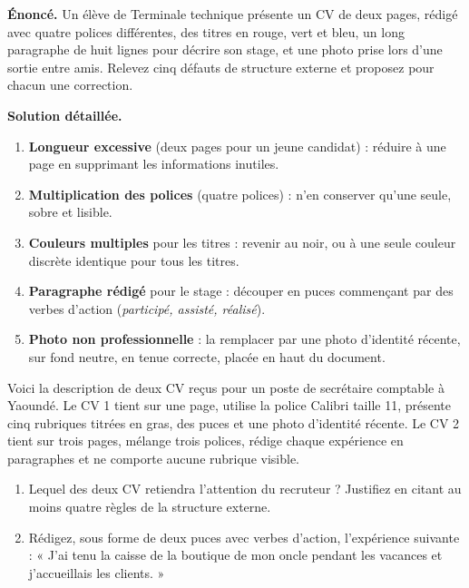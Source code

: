 \documentclass[11pt]{article}
\begin{document}
\begin{exoresolu}
\textbf{Énoncé.} Un élève de Terminale technique présente un CV de deux pages, rédigé avec quatre polices différentes, des titres en rouge, vert et bleu, un long paragraphe de huit lignes pour décrire son stage, et une photo prise lors d'une sortie entre amis. Relevez cinq défauts de structure externe et proposez pour chacun une correction.

\tcblower
\textbf{Solution détaillée.}
\begin{enumerate}
\item \textbf{Longueur excessive} (deux pages pour un jeune candidat) : réduire à une page en supprimant les informations inutiles.
\item \textbf{Multiplication des polices} (quatre polices) : n'en conserver qu'une seule, sobre et lisible.
\item \textbf{Couleurs multiples} pour les titres : revenir au noir, ou à une seule couleur discrète identique pour tous les titres.
\item \textbf{Paragraphe rédigé} pour le stage : découper en puces commençant par des verbes d'action (\emph{participé, assisté, réalisé}).
\item \textbf{Photo non professionnelle} : la remplacer par une photo d'identité récente, sur fond neutre, en tenue correcte, placée en haut du document.
\end{enumerate}
\end{exoresolu}

\begin{exercice}
Voici la description de deux CV reçus pour un poste de secrétaire comptable à Yaoundé. Le CV 1 tient sur une page, utilise la police Calibri taille 11, présente cinq rubriques titrées en gras, des puces et une photo d'identité récente. Le CV 2 tient sur trois pages, mélange trois polices, rédige chaque expérience en paragraphes et ne comporte aucune rubrique visible.
\begin{enumerate}
\item Lequel des deux CV retiendra l'attention du recruteur ? Justifiez en citant au moins quatre règles de la structure externe.
\item Rédigez, sous forme de deux puces avec verbes d'action, l'expérience suivante : « J'ai tenu la caisse de la boutique de mon oncle pendant les vacances et j'accueillais les clients. »
\end{enumerate}
\end{exercice}
\end{document}

